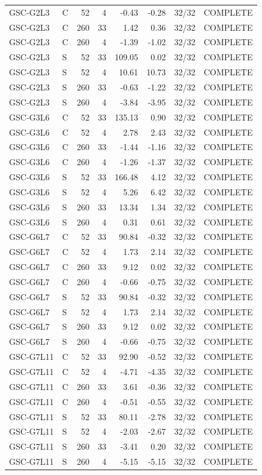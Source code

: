 \begin{longtable}{llrrrrrl}
GSC-G2L3 & C & 52 & 4 & -0.43 & -0.28 & 32/32 & COMPLETE \\
GSC-G2L3 & C & 260 & 33 & 1.42 & 0.36 & 32/32 & COMPLETE \\
GSC-G2L3 & C & 260 & 4 & -1.39 & -1.02 & 32/32 & COMPLETE \\
GSC-G2L3 & S & 52 & 33 & 109.05 & 0.02 & 32/32 & COMPLETE \\
GSC-G2L3 & S & 52 & 4 & 10.61 & 10.73 & 32/32 & COMPLETE \\
GSC-G2L3 & S & 260 & 33 & -0.63 & -1.22 & 32/32 & COMPLETE \\
GSC-G2L3 & S & 260 & 4 & -3.84 & -3.95 & 32/32 & COMPLETE \\
GSC-G3L6 & C & 52 & 33 & 135.13 & 0.90 & 32/32 & COMPLETE \\
GSC-G3L6 & C & 52 & 4 & 2.78 & 2.43 & 32/32 & COMPLETE \\
GSC-G3L6 & C & 260 & 33 & -1.44 & -1.16 & 32/32 & COMPLETE \\
GSC-G3L6 & C & 260 & 4 & -1.26 & -1.37 & 32/32 & COMPLETE \\
GSC-G3L6 & S & 52 & 33 & 166.48 & 4.12 & 32/32 & COMPLETE \\
GSC-G3L6 & S & 52 & 4 & 5.26 & 6.42 & 32/32 & COMPLETE \\
GSC-G3L6 & S & 260 & 33 & 13.34 & 1.34 & 32/32 & COMPLETE \\
GSC-G3L6 & S & 260 & 4 & 0.31 & 0.61 & 32/32 & COMPLETE \\
GSC-G6L7 & C & 52 & 33 & 90.84 & -0.32 & 32/32 & COMPLETE \\
GSC-G6L7 & C & 52 & 4 & 1.73 & 2.14 & 32/32 & COMPLETE \\
GSC-G6L7 & C & 260 & 33 & 9.12 & 0.02 & 32/32 & COMPLETE \\
GSC-G6L7 & C & 260 & 4 & -0.66 & -0.75 & 32/32 & COMPLETE \\
GSC-G6L7 & S & 52 & 33 & 90.84 & -0.32 & 32/32 & COMPLETE \\
GSC-G6L7 & S & 52 & 4 & 1.73 & 2.14 & 32/32 & COMPLETE \\
GSC-G6L7 & S & 260 & 33 & 9.12 & 0.02 & 32/32 & COMPLETE \\
GSC-G6L7 & S & 260 & 4 & -0.66 & -0.75 & 32/32 & COMPLETE \\
GSC-G7L11 & C & 52 & 33 & 92.90 & -0.52 & 32/32 & COMPLETE \\
GSC-G7L11 & C & 52 & 4 & -4.71 & -4.35 & 32/32 & COMPLETE \\
GSC-G7L11 & C & 260 & 33 & 3.61 & -0.36 & 32/32 & COMPLETE \\
GSC-G7L11 & C & 260 & 4 & -0.51 & -0.55 & 32/32 & COMPLETE \\
GSC-G7L11 & S & 52 & 33 & 80.11 & -2.78 & 32/32 & COMPLETE \\
GSC-G7L11 & S & 52 & 4 & -2.03 & -2.67 & 32/32 & COMPLETE \\
GSC-G7L11 & S & 260 & 33 & -3.41 & 0.20 & 32/32 & COMPLETE \\
GSC-G7L11 & S & 260 & 4 & -5.15 & -5.15 & 32/32 & COMPLETE \\
\bottomrule\end{longtable}\endgroup
